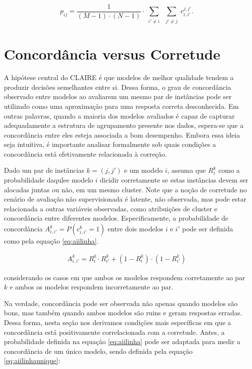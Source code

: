 \begin{equation}
     p_{ij} = \frac{1}{(M - 1)\cdot (N - 1)}
     \cdot\sum\limits_{\substack{i' \not = i}}\sum\limits_{\substack{j' \not = j}} c^{j, j'}_ {i, i'}.
     \label{eq:response_matrix}
\end{equation}

\section{Concordância versus Corretude}\label{sec:agree_correctness}

A hipótese central do \gls{CLAIRE} é que modelos de melhor qualidade tendem a produzir decisões semelhantes entre si. Dessa forma, o grau de concordância observado entre modelos ao avaliarem um mesmo par de instâncias pode ser utilizado como uma aproximação para uma resposta correta desconhecida. Em outras palavras, quando a maioria dos modelos avaliados é capaz de capturar adequadamente a estrutura de agrupamento presente nos dados, espera-se que a concordância entre eles esteja associada a bom desempenho. Embora essa ideia seja intuitiva, é importante analisar formalmente sob quais condições a concordância está efetivamente relacionada à correção.

Dado um par de instâncias $k = (j, j')$ e um modelo $i$, assuma que $R_{i}^k$ como a probabilidade daqulee modelo $i$ dicidir corretamente se estas instâncias devem ser alocadas juntas ou não, em um mesmo cluster. Note que a noção de corretude no cenário de avaliação não supervisionada é latente, não observada, mas pode estar relacionada a outras variáveis observadas, como atribuições de cluster e concordância entre diferentes modelos. Especificamente, a probabilidade de concordância $A_{i,i'}^k = P(c_{i,i'}^k = 1)$ entre dois modelos $i$ e $i'$ pode ser definida como pela equação \ref{eq:aiilinha}.

\begin{align} \label{eq:aiilinha}
    A_{i,i'}^k = R_{i}^k \cdot R_{i'}^k + (1-R_{i}^k)\cdot (1-R_{i'}^k)
\end{align}

\noindent considerando os casos em que ambos os modelos respondem corretamente ao par $k$ e ambos os modelos respondem incorretamente ao par.

Na verdade, concordância pode ser observada não apenas quando modelos são bons, mas também quando ambos modelos são ruins e geram respostas erradas. Dessa forma, nesta seção nos derivamos condições mais específicas em que a concordância está positivamente correlacionada com a corretude. Antes, a probabilidade definida na equação \ref{eq:aiilinha} pode ser adaptada para medir a concordância de um único modelo, sendo definida pela equação \ref{eq:aiilinhaunique}:


